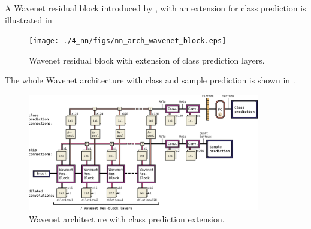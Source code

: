 A Wavenet residual block introduced by \cite{Oord2016}, with an extension for class prediction is illustrated in  
\begin{figure}[!ht]
  \centering
    \texttt{[image: ./4\_nn/figs/nn\_arch\_wavenet\_block.eps]}
  \caption{Wavenet residual block \cite{Oord2016} with extension of class prediction layers.}
  \label{fig:nn_arch_wavenet_block}
\end{figure}
\FloatBarrier
\noindent
The whole Wavenet architecture with class and sample prediction is shown in .
\begin{figure}[!ht]
  \centering
    \includegraphics[width=0.9\textwidth]{./4_nn/figs/nn_arch_wavenet_all.eps}
  \caption{Wavenet architecture with class prediction extension.}
  \label{fig:nn_arch_wavenet_all}
\end{figure}
\FloatBarrier
\noindent

